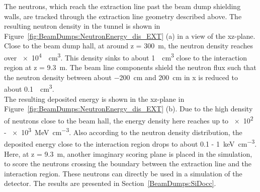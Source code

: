 The neutrons, which reach the extraction line past the beam dump shielding walls, are tracked through the extraction line geometry described above.
The resulting neutron density in the tunnel is shown in Figure~\ref{fig:BeamDumps:NeutronEnergy_dis_EXT} (a) in a view of the xz-plane.
Close to the beam dump hall, at around z = \SI{300}{\meter}, the neutron density reaches over \SI{e4}{\per\centi\meter\cubed}.
This density sinks to about \SI{1}{\per\centi\meter\cubed} close to the interaction region at z = \SI{9.3}{\meter}.
The beam line components shield the neutron flux such that the neutron density between about \SI{-200}{\centi\meter} and \SI{200}{\centi\meter} in x is reduced to about \SI{0.1}{\per\centi\meter\cubed}.
\\The resulting deposited energy is shown in the xz-plane in Figure~\ref{fig:BeamDumps:NeutronEnergy_dis_EXT} (b).
Due to the high density of neutrons close to the beam hall, the energy density here reaches up to 
\num{e2} - \SI{e3}{\MeV\per\centi\meter\cubed}.
Also according to the neutron density distribution, the deposited energy close to the interaction region drops to about \num{0.1} - \SI{1}{\keV\per\centi\meter\cubed}.
\\Here, at z = \SI{9.3}{\meter}, another imaginary scoring plane is placed in the \fluka simulation, to score the neutrons crossing the boundary between the extraction line and the interaction region.
These neutrons can directly be used in a \geant simulation of the \sid detector.
The results are presented in Section~\ref{BeamDumps:SiDocc}.
